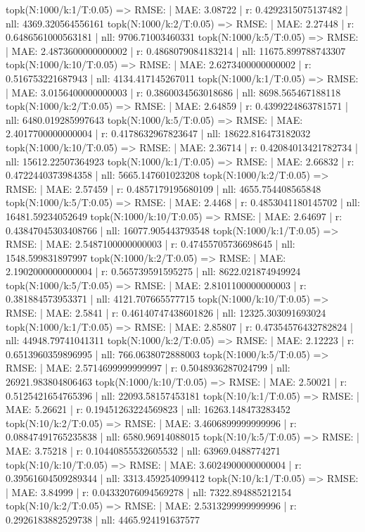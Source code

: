 topk(N:1000/k:1/T:0.05) => RMSE: | MAE: 3.08722 | r: 0.4292315075137482 | nll: 4369.320564556161
topk(N:1000/k:2/T:0.05) => RMSE: | MAE: 2.27448 | r: 0.6486561000563181 | nll: 9706.71003460331
topk(N:1000/k:5/T:0.05) => RMSE: | MAE: 2.4873600000000002 | r: 0.4868079084183214 | nll: 11675.899788743307
topk(N:1000/k:10/T:0.05) => RMSE: | MAE: 2.6273400000000002 | r: 0.516753221687943 | nll: 4134.417145267011
topk(N:1000/k:1/T:0.05) => RMSE: | MAE: 3.0156400000000003 | r: 0.3860034563018686 | nll: 8698.565467188118
topk(N:1000/k:2/T:0.05) => RMSE: | MAE: 2.64859 | r: 0.4399224863781571 | nll: 6480.019285997643
topk(N:1000/k:5/T:0.05) => RMSE: | MAE: 2.4017700000000004 | r: 0.4178632967823647 | nll: 18622.816473182032
topk(N:1000/k:10/T:0.05) => RMSE: | MAE: 2.36714 | r: 0.42084013421782734 | nll: 15612.22507364923
topk(N:1000/k:1/T:0.05) => RMSE: | MAE: 2.66832 | r: 0.4722440373984358 | nll: 5665.147601023208
topk(N:1000/k:2/T:0.05) => RMSE: | MAE: 2.57459 | r: 0.4857179195680109 | nll: 4655.754408565848
topk(N:1000/k:5/T:0.05) => RMSE: | MAE: 2.4468 | r: 0.4853041180145702 | nll: 16481.59234052649
topk(N:1000/k:10/T:0.05) => RMSE: | MAE: 2.64697 | r: 0.43847045303408766 | nll: 16077.905443793548
topk(N:1000/k:1/T:0.05) => RMSE: | MAE: 2.5487100000000003 | r: 0.47455705736698645 | nll: 1548.599831897997
topk(N:1000/k:2/T:0.05) => RMSE: | MAE: 2.1902000000000004 | r: 0.565739591595275 | nll: 8622.021874949924
topk(N:1000/k:5/T:0.05) => RMSE: | MAE: 2.8101100000000003 | r: 0.381884573953371 | nll: 4121.707665577715
topk(N:1000/k:10/T:0.05) => RMSE: | MAE: 2.5841 | r: 0.46140747438601826 | nll: 12325.303091693024
topk(N:1000/k:1/T:0.05) => RMSE: | MAE: 2.85807 | r: 0.47354576432782824 | nll: 44948.79741041311
topk(N:1000/k:2/T:0.05) => RMSE: | MAE: 2.12223 | r: 0.6513960359896995 | nll: 766.0638072888003
topk(N:1000/k:5/T:0.05) => RMSE: | MAE: 2.5714699999999997 | r: 0.5048936287024799 | nll: 26921.983804806463
topk(N:1000/k:10/T:0.05) => RMSE: | MAE: 2.50021 | r: 0.5125421654765396 | nll: 22093.58157453181
topk(N:10/k:1/T:0.05) => RMSE: | MAE: 5.26621 | r: 0.19451263224569823 | nll: 16263.148473283452
topk(N:10/k:2/T:0.05) => RMSE: | MAE: 3.4606899999999996 | r: 0.08847491765235838 | nll: 6580.96914088015
topk(N:10/k:5/T:0.05) => RMSE: | MAE: 3.75218 | r: 0.10440855532605532 | nll: 63969.0488774271
topk(N:10/k:10/T:0.05) => RMSE: | MAE: 3.6024900000000004 | r: 0.39561604509289344 | nll: 3313.459254099412
topk(N:10/k:1/T:0.05) => RMSE: | MAE: 3.84999 | r: 0.04332076094569278 | nll: 7322.894885212154
topk(N:10/k:2/T:0.05) => RMSE: | MAE: 2.5313299999999996 | r: 0.2926183882529738 | nll: 4465.924191637577
